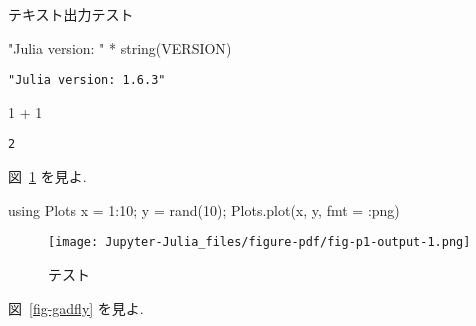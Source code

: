 \documentclass[
  letterpaper,
  DIV=11,
  pandoc,
  ja=standard,
  jafont=haranoaji]{bxjsarticle}
\newenvironment{Shaded}{\begin{snugshade}}{\end{snugshade}}
\newcommand{\ConstantTok}[1]{\textcolor[rgb]{0.56,0.35,0.01}{#1}}
\newcommand{\FloatTok}[1]{\textcolor[rgb]{0.68,0.00,0.00}{#1}}
\newcommand{\FunctionTok}[1]{\textcolor[rgb]{0.28,0.35,0.67}{#1}}
\newcommand{\KeywordTok}[1]{\textcolor[rgb]{0.00,0.48,0.65}{#1}}
\newcommand{\NormalTok}[1]{\textcolor[rgb]{0.00,0.48,0.65}{#1}}
\newcommand{\OperatorTok}[1]{\textcolor[rgb]{0.37,0.37,0.37}{#1}}
\newcommand{\StringTok}[1]{\textcolor[rgb]{0.13,0.47,0.30}{#1}}
\begin{document}
テキスト出力テスト

\begin{Shaded}
\begin{Highlighting}[]
\StringTok{"Julia version: "} \OperatorTok{*} \FunctionTok{string}\NormalTok{(}\ConstantTok{VERSION}\NormalTok{)}
\end{Highlighting}
\end{Shaded}

\begin{verbatim}
"Julia version: 1.6.3"
\end{verbatim}

\begin{Shaded}
\begin{Highlighting}[]
\FloatTok{1} \OperatorTok{+} \FloatTok{1}
\end{Highlighting}
\end{Shaded}

\begin{verbatim}
2
\end{verbatim}

図~\ref{fig-p1} を見よ.

\begin{Shaded}
\begin{Highlighting}[]
\KeywordTok{using}\NormalTok{ Plots}
\NormalTok{x }\OperatorTok{=} \FloatTok{1}\OperatorTok{:}\FloatTok{10}\OperatorTok{;}\NormalTok{ y }\OperatorTok{=} \FunctionTok{rand}\NormalTok{(}\FloatTok{10}\NormalTok{)}\OperatorTok{;}
\NormalTok{Plots.}\FunctionTok{plot}\NormalTok{(x}\OperatorTok{,}\NormalTok{ y}\OperatorTok{,}\NormalTok{ fmt }\OperatorTok{=} \OperatorTok{:}\NormalTok{png)}
\end{Highlighting}
\end{Shaded}

\begin{figure}

{\centering \texttt{[image: Jupyter-Julia\_files/figure-pdf/fig-p1-output-1.png]}

}

\caption{\label{fig-p1}テスト}

\end{figure}

図~\ref{fig-gadfly} を見よ.
\end{document}
